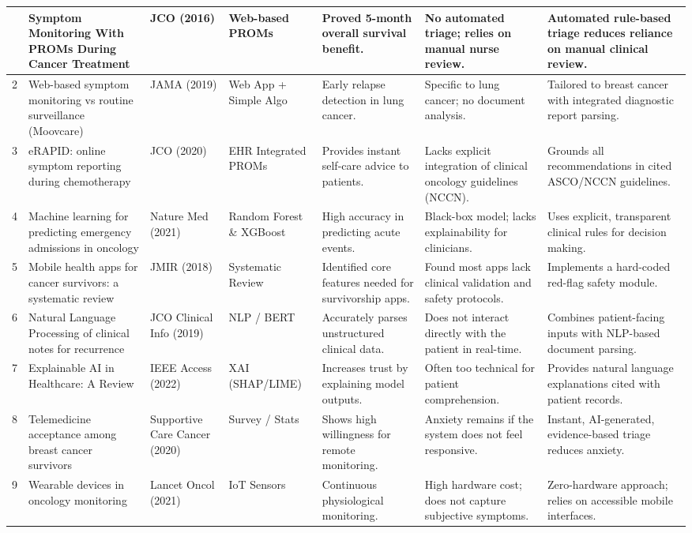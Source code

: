 \documentclass[10pt,journal,compsoc]{IEEEtran}
\begin{document}
\begin{longtable}{|p{0.5cm}|p{3cm}|p{1.5cm}|p{2cm}|p{2.5cm}|p{3cm}|p{3.5cm}|}
\hline \hline
\endlastfoot
1 & Symptom Monitoring With PROMs During Cancer Treatment & JCO (2016) & Web-based PROMs & Proved 5-month overall survival benefit. & No automated triage; relies on manual nurse review. & Automated rule-based triage reduces reliance on manual clinical review. \\ \hline
2 & Web-based symptom monitoring vs routine surveillance (Moovcare) & JAMA (2019) & Web App + Simple Algo & Early relapse detection in lung cancer. & Specific to lung cancer; no document analysis. & Tailored to breast cancer with integrated diagnostic report parsing. \\ \hline
3 & eRAPID: online symptom reporting during chemotherapy & JCO (2020) & EHR Integrated PROMs & Provides instant self-care advice to patients. & Lacks explicit integration of clinical oncology guidelines (NCCN). & Grounds all recommendations in cited ASCO/NCCN guidelines. \\ \hline
4 & Machine learning for predicting emergency admissions in oncology & Nature Med (2021) & Random Forest \& XGBoost & High accuracy in predicting acute events. & Black-box model; lacks explainability for clinicians. & Uses explicit, transparent clinical rules for decision making. \\ \hline
5 & Mobile health apps for cancer survivors: a systematic review & JMIR (2018) & Systematic Review & Identified core features needed for survivorship apps. & Found most apps lack clinical validation and safety protocols. & Implements a hard-coded red-flag safety module. \\ \hline
6 & Natural Language Processing of clinical notes for recurrence & JCO Clinical Info (2019) & NLP / BERT & Accurately parses unstructured clinical data. & Does not interact directly with the patient in real-time. & Combines patient-facing inputs with NLP-based document parsing. \\ \hline
7 & Explainable AI in Healthcare: A Review & IEEE Access (2022) & XAI (SHAP/LIME) & Increases trust by explaining model outputs. & Often too technical for patient comprehension. & Provides natural language explanations cited with patient records. \\ \hline
8 & Telemedicine acceptance among breast cancer survivors & Supportive Care Cancer (2020) & Survey / Stats & Shows high willingness for remote monitoring. & Anxiety remains if the system does not feel responsive. & Instant, AI-generated, evidence-based triage reduces anxiety. \\ \hline
9 & Wearable devices in oncology monitoring & Lancet Oncol (2021) & IoT Sensors & Continuous physiological monitoring. & High hardware cost; does not capture subjective symptoms. & Zero-hardware approach; relies on accessible mobile interfaces. \\ \hline

\end{longtable}
\end{document}
